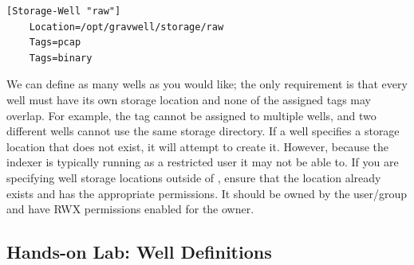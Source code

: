 \begin{Verbatim}[breaklines=true]
[Storage-Well "raw"]
    Location=/opt/gravwell/storage/raw
    Tags=pcap
    Tags=binary
\end{Verbatim}

We can define as many wells as you would like; the only requirement is
that every well must have its own storage location and none of the
assigned tags may overlap. For example, the tag  cannot be
assigned to multiple wells, and two different wells cannot use the same
storage directory. If a well specifies a storage location that does not
exist, it will attempt to create it. However, because the indexer is
typically running as a restricted user it may not be able to. If you
are specifying well storage locations outside of
, ensure that the location already exists and has the
appropriate permissions. It should be owned by the user/group
 and have RWX permissions enabled for the owner.

\subsection{Hands-on Lab: Well Definitions}

